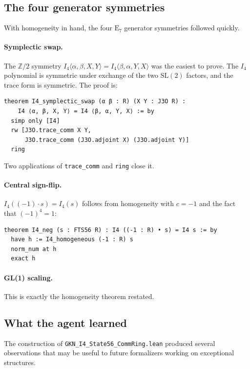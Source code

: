 \documentclass[11pt]{article}
\theoremstyle{definition}
\newcommand{\Iq}{I_4}
\begin{document}
\subsection{The four generator symmetries}
\label{sec:agent-sym}

With homogeneity in hand, the four $\mathrm{E}_7$ generator symmetries
followed quickly.

\paragraph{Symplectic swap.}
The $\mathbb{Z}/2$ symmetry $\Iq\langle\alpha,\beta,X,Y\rangle=
\Iq\langle\beta,\alpha,Y,X\rangle$ was the easiest to prove. The
$\Iq$ polynomial is symmetric under exchange of the two $\mathrm{SL}(2)$
factors, and the trace form is symmetric. The proof is:

\begin{lstlisting}[language=leanL]
theorem I4_symplectic_swap (α β : R) (X Y : J3O R) :
    I4 ⟨α, β, X, Y⟩ = I4 ⟨β, α, Y, X⟩ := by
  simp only [I4]
  rw [J3O.trace_comm X Y,
      J3O.trace_comm (J3O.adjoint X) (J3O.adjoint Y)]
  ring
\end{lstlisting}

Two applications of \texttt{trace\_comm} and \texttt{ring} close it.

\paragraph{Central sign-flip.}
$\Iq((-1)\cdot s)=\Iq(s)$ follows from homogeneity with $c=-1$ and the
fact that $(-1)^4=1$:

\begin{lstlisting}[language=leanL]
theorem I4_neg (s : FTS56 R) : I4 ((-1 : R) • s) = I4 s := by
  have h := I4_homogeneous (-1 : R) s
  norm_num at h
  exact h
\end{lstlisting}

\paragraph{GL(1) scaling.}
This is exactly the homogeneity theorem restated.

\subsection{What the agent learned}
\label{sec:agent-lessons}

The construction of \texttt{GKN\_I4\_State56\_CommRing.lean} produced
several observations that may be useful to future formalizers working on
exceptional structures.
\end{document}
